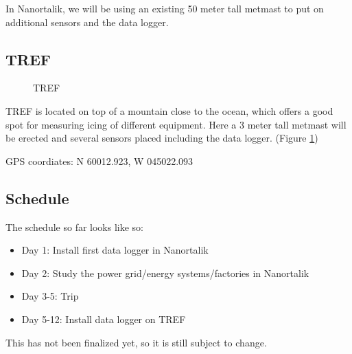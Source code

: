 \documentclass{project}
\begin{document}
In Nanortalik, we will be using an existing 50 meter tall metmast to put on additional sensors and the data logger.

\subsection{TREF}
\begin{figure}[!ht]
\centering
{}
\caption{TREF}
\label{tref}
\end{figure}
TREF is located on top of a mountain close to the ocean, which offers a good spot for measuring icing of different equipment. Here a 3 meter tall metmast will be erected and several sensors placed including the data logger. (Figure \ref{tref})

GPS coordiates: N 60012.923, W 045022.093

\subsection{Schedule}
The schedule so far looks like so:
\begin{itemize}\addtolength{\itemsep}{-0.5\baselineskip}
\item Day 1: Install first data logger in Nanortalik
\item Day 2: Study the power grid/energy systems/factories in Nanortalik
\item Day 3-5: Trip
\item Day 5-12: Install data logger on TREF  
\end{itemize}
This has not been finalized yet, so it is still subject to change.

%
%
%
\end{document}
